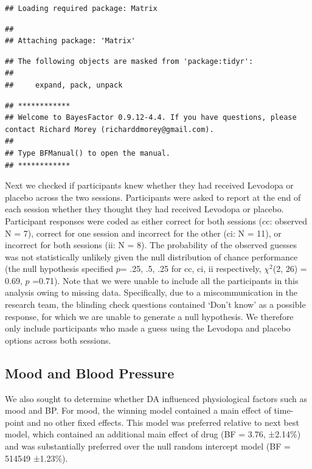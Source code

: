 \documentclass{article}
\begin{document}
\begin{verbatim}
## Loading required package: Matrix
\end{verbatim}

\begin{verbatim}
## 
## Attaching package: 'Matrix'
\end{verbatim}

\begin{verbatim}
## The following objects are masked from 'package:tidyr':
## 
##     expand, pack, unpack
\end{verbatim}

\begin{verbatim}
## ************
## Welcome to BayesFactor 0.9.12-4.4. If you have questions, please contact Richard Morey (richarddmorey@gmail.com).
## 
## Type BFManual() to open the manual.
## ************
\end{verbatim}

Next we checked if participants knew whether they had received Levodopa
or placebo across the two sessions. Participants were asked to report at
the end of each session whether they thought they had received Levodopa
or placebo. Participant responses were coded as either correct for both
sessions (cc: observed N = 7), correct for one session and incorrect for
the other (ci: N = 11), or incorrect for both sessions (ii: N = 8). The
probability of the observed guesses was not statistically unlikely given
the null distribution of chance performance (the null hypothesis
specified \(p\)= .25, .5, .25 for cc, ci, ii respectively, \(\chi^2\)(2,
26) = 0.69, \(p\) =0.71). Note that we were unable to include all the
participants in this analysis owing to missing data. Specifically, due
to a miscommunication in the research team, the blinding check questions
contained `Don't know' as a possible response, for which we are unable
to generate a null hypothesis. We therefore only include participants
who made a guess using the Levodopa and placebo options across both
sessions.

\hypertarget{mood-and-blood-pressure}{%
\subsection{Mood and Blood Pressure}\label{mood-and-blood-pressure}}

We also sought to determine whether DA influenced physiological factors
such as mood and BP. For mood, the winning model contained a main effect
of time-point and no other fixed effects. This model was preferred
relative to next best model, which contained an additional main effect
of drug (BF = 3.76, ±2.14\%) and was substantially preferred over the
null random intercept model (BF = 514549 ±1.23\%).
\end{document}
